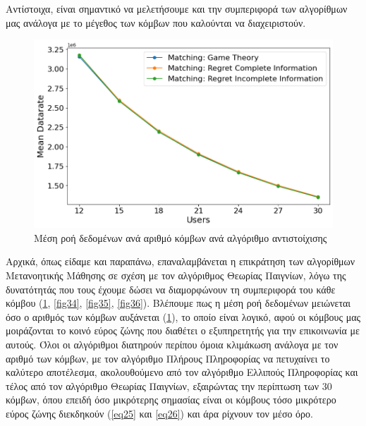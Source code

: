 Αντίστοιχα, είναι σημαντικό να μελετήσουμε και την συμπεριφορά των αλγορίθμων μας ανάλογα με το μέγεθος των κόμβων που καλούνται να διαχειριστούν.

\begin{figure}[ht]
    \centering
    \includegraphics[width=\textwidth]{figures/chapter4/Mean_Datarate_vs_Users.png}
    \caption{Μέση ροή δεδομένων ανά αριθμό κόμβων ανά αλγόριθμο αντιστοίχισης}
    \label{fig33}
\end{figure}

Αρχικά, όπως είδαμε και παραπάνω, επαναλαμβάνεται η επικράτηση των αλγορίθμων Μετανοητικής Μάθησης σε σχέση με τον αλγόριθμος Θεωρίας Παιγνίων, λόγω της δυνατότητάς που τους έχουμε δώσει να διαμορφώνουν τη συμπεριφορά του κάθε κόμβου (\ref{fig33}, \ref{fig34}, \ref{fig35}, \ref{fig36}). Βλέπουμε πως η μέση ροή δεδομένων μειώνεται όσο ο αριθμός των κόμβων αυξάνεται (\ref{fig33}), το οποίο είναι λογικό, αφού οι κόμβους μας μοιράζονται το κοινό εύρος ζώνης που διαθέτει ο εξυπηρετητής για την επικοινωνία με αυτούς. Όλοι οι αλγόριθμοι διατηρούν περίπου όμοια κλιμάκωση ανάλογα με τον αριθμό των κόμβων, με τον αλγόριθμο Πλήρους Πληροφορίας να πετυχαίνει το καλύτερο αποτέλεσμα, ακολουθούμενο από τον αλγόριθμο Ελλιπούς Πληροφορίας και τέλος από τον αλγόριθμο Θεωρίας Παιγνίων, εξαιρώντας την περίπτωση των 30 κόμβων, όπου επειδή όσο μικρότερης σημασίας είναι οι κόμβους τόσο μικρότερο εύρος ζώνης διεκδηκούν (\ref{eq25} και \ref{eq26}) και άρα ρίχνουν τον μέσο όρο. 

